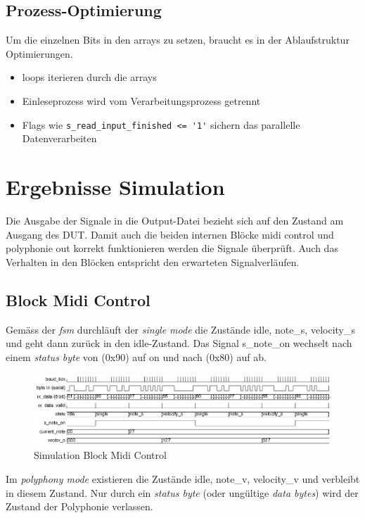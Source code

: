 \subsection{Prozess-Optimierung}

Um die einzelnen Bits in den arrays zu setzen, braucht es in der Ablaufstruktur Optimierungen.

\begin{itemize}
	\item loops iterieren durch die arrays
	\item Einleseprozess wird vom Verarbeitungsprozess getrennt
	\item Flags wie \lstinline|s_read_input_finished <= '1'| sichern das parallelle Datenverarbeiten
\end{itemize}

\section{Ergebnisse Simulation}\label{sec.ergebnisse_tests}
Die Ausgabe der Signale in die Output-Datei bezieht sich auf den Zustand am Ausgang des DUT. Damit auch die beiden internen Blöcke midi control und polyphonie out korrekt funktionieren werden die Signale überprüft. Auch das Verhalten in den Blöcken entspricht den erwarteten Signalverläufen.\\

\subsection{Block Midi Control}
Gemäss der \textit{fsm} durchläuft der \textit{single mode}  die Zustände idle, note\_s, velocity\_s und geht dann zurück  in den idle-Zustand. Das Signal s\_note\_on wechselt nach einem \textit{status byte} von (0x90) auf on und nach (0x80) auf ab.
\begin{figure}[H]
	\includegraphics[width=1\textwidth]{images/midi_control/wave_single.png}
	\caption{Simulation Block Midi Control}
	\label{fig.test_midi:control_single}
\end{figure} 

Im \textit{polyphony mode} existieren die Zustände idle, note\_v, velocity\_v und verbleibt in diesem Zustand. Nur durch ein \textit{status byte} (oder ungültige \textit{data bytes}) wird der Zustand der Polyphonie verlassen.

